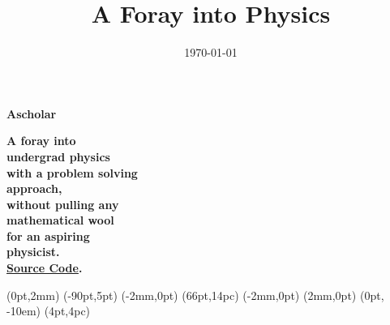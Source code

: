 \documentclass[twoside, 11pt, a4paper]{memoir}
\date{\today}
\title{A Foray into Physics}
\begin{document}
\pagestyle{empty}
\NewCoffin \result
\NewCoffin \aaa
\NewCoffin \bbb
\NewCoffin \ccc
\NewCoffin \ddd
\NewCoffin \eee
\NewCoffin \fff
\NewCoffin {}
\NewCoffin {}
\NewCoffin {}

\SetHorizontalCoffin \result {}
\SetHorizontalCoffin {}
\SetHorizontalCoffin {}
\SetHorizontalCoffin {}
\SetHorizontalCoffin {}
\SetVerticalCoffin \eee {180pt}
               {\raggedleft\fontsize{31}{36}\sffamily\bfseries
               Ascholar}
\SetVerticalCoffin \fff {140pt}
               {\raggedright \fontsize{13}{14}\sffamily\bfseries
                     A foray into \\
                     undergrad physics \\
                     with a problem solving \\
                      approach, \\
                      without pulling any\\
                     mathematical wool\\
                     for an aspiring\\
                     physicist. \\
                     \href{https://github.com/Anonscholar}{Source Code}.\\}

\RotateCoffin {}
\RotateCoffin {}

\SetHorizontalCoffin {}
\SetHorizontalCoffin {}
\SetHorizontalCoffin {}


\JoinCoffins \result                \aaa
\JoinCoffins {} (0pt,2mm)
\JoinCoffins {} \bbb     [B,r](-90pt,5pt)
\JoinCoffins {} (-2mm,0pt)
\JoinCoffins {} \ccc     [B,l](66pt,14pc)
\JoinCoffins {} \fff     [t,r](-2mm,0pt)
\JoinCoffins {} (2mm,0pt)
\JoinCoffins {} \eee     [B,r] (0pt, -10em)
\JoinCoffins {} \ddd     [B,r](4pt,4pc)
\end{document}
